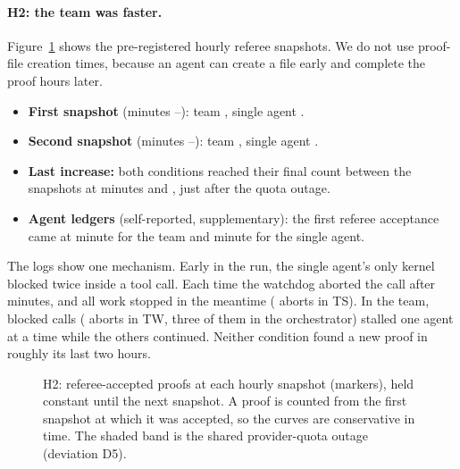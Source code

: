\documentclass[11pt]{article}
\begin{document}
\paragraph{H2: the team was faster.}
Figure~\ref{fig:curve} shows the pre-registered hourly referee snapshots. We do not use proof-file creation times,
because an agent can create a file early and complete the proof hours later.
\begin{itemize}
  \item \textbf{First snapshot} (minutes \CSsevenSnapOneMinTS--\CSsevenSnapOneMinTW): team \CSsevenSnapOneTW{}, single
    agent \CSsevenSnapOneTS.
  \item \textbf{Second snapshot} (minutes \CSsevenSnapTwoMinTS--\CSsevenSnapTwoMinTW): team \CSsevenSnapTwoTW{}, single
    agent \CSsevenSnapTwoTS.
  \item \textbf{Last increase:} both conditions reached their final count between the snapshots at minutes
    \CSsevenFinalAfterMinTS{} and \CSsevenFinalByMinTS{}, just after the quota outage.
  \item \textbf{Agent ledgers} (self-reported, supplementary): the first referee acceptance came at minute
    \CSsevenLedgerFirstTW{} for the team and minute \CSsevenLedgerFirstTS{} for the single agent.
\end{itemize}
The logs show one mechanism. Early in the run, the single agent's only kernel blocked twice inside a tool call. Each
time the watchdog aborted the call after \WatchdogBlockMin{} minutes, and all work stopped in the meantime (\CSsevenTSAborts{} aborts in
TS). In the team, blocked calls (\CSsevenTWAborts{} aborts in TW, three of them in the orchestrator) stalled one agent at
a time while the others continued. Neither condition found a
new proof in roughly its last two hours.

\begin{figure}[t]
\centering
{}
\caption{H2: referee-accepted proofs at each hourly snapshot (markers), held constant until the next snapshot. A
proof is counted from the first snapshot at which it was accepted, so the curves are conservative in time. The shaded
band is the shared provider-quota outage (deviation D5).}
\label{fig:curve}
\end{figure}
\end{document}
